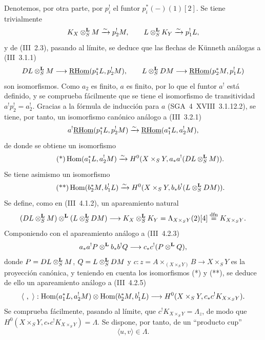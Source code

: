 Denotemos, por otra parte, por $p_i^!$ el funtor $p_i^*(-)(1)[2]$. Se tiene trivialmente
\[
K_X\otimes_S^{\mathbf L}M\xrightarrow{\sim}p_2^!M,
\qquad
L\otimes_S^{\mathbf L}K_Y\xrightarrow{\sim}p_1^!L,
\]
y de (III~2.3), pasando al límite, se deduce que las flechas de Künneth análogas a (III~3.1.1)
\[
DL\otimes_S^{\mathbf L}M\longrightarrow \underline{\mathrm{RHom}}(p_1^*L,p_2^!M),
\qquad
L\otimes_S^{\mathbf L}DM\longrightarrow \underline{\mathrm{RHom}}(p_2^*M,p_1^!L)
\]
son isomorfismos. Como $a_2$ es finito, $a$ es finito, por lo que el funtor $a^!$ está definido, y se comprueba fácilmente que se tiene el isomorfismo de transitividad $a^!p_2^!=a_2^!$. Gracias a la fórmula de inducción para $a$ (SGA~4~XVIII~3.1.12.2), se tiene, por tanto, un isomorfismo canónico análogo a (III~3.2.1)
\[
a^!\underline{\mathrm{RHom}}(p_1^*L,p_2^!M)\xrightarrow{\sim}\underline{\mathrm{RHom}}(a_1^*L,a_2^!M),
\]
de donde se obtiene un isomorfismo
\begin{equation}\tag{*}
\operatorname{Hom}(a_1^*L,a_2^!M)\xrightarrow{\sim}H^0(X\times_S Y,a_*a^!(DL\otimes_S^{\mathbf L}M)).
\end{equation}
Se tiene asimismo un isomorfismo
\begin{equation}\tag{**}
\operatorname{Hom}(b_2^*M,b_1^!L)\xrightarrow{\sim}H^0(X\times_S Y,b_*b^!(L\otimes_S^{\mathbf L}DM)).
\end{equation}
Se define, como en (III~4.1.2), un apareamiento natural
\[
(DL\otimes_S^{\mathbf L}M)\otimes^{\mathbf L}(L\otimes_S^{\mathbf L}DM)
\longrightarrow K_X\otimes_S^{\mathbf L}K_Y=\Lambda_{X\times_S Y}(2)[4]\stackrel{\mathrm{dfn}}{=}K_{X\times_S Y}.
\]
Componiendo con el apareamiento análogo a (III~4.2.3)
\[
a_*a^!P\otimes^{\mathbf L} b_*b^!Q\longrightarrow c_*c^!(P\otimes^{\mathbf L}Q),
\]
donde $P=DL\otimes_S^{\mathbf L}M$, $Q=L\otimes_S^{\mathbf L}DM$ y $c:z=A\times_{(X\times_S Y)}B\to X\times_S Y$ es la proyección canónica, y teniendo en cuenta los isomorfismos (*) y (**), se deduce de ello un apareamiento análogo a (III~4.2.5)
\[
\langle\ ,\ \rangle:\Hom(a_1^*L,a_2^!M)\otimes\Hom(b_2^*M,b_1^!L)
\longrightarrow H^0(X\times_S Y,c_*c^!K_{X\times_S Y}).
\]
Se comprueba fácilmente, pasando al límite, que $c^!K_{X\times_S Y}=\Lambda_z$, de modo que $H^0(X\times_S Y,c_*c^!K_{X\times_S Y})=\Lambda$. Se dispone, por tanto, de un ``producto cup''
\begin{equation}\tag{1.1.2}
\langle u,v\rangle\in\Lambda.
\end{equation}
